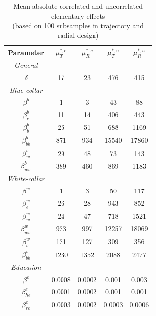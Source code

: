 \documentclass[a4paper,12pt]{article}
\begin{document}
\newpage
\setlength{\tabcolsep}{22pt} %
\begin{table}[H] 
	\centering
	\begin{threeparttable}
		\caption[Model Parametrization]{Mean absolute correlated and uncorrelated elementary effects\\ (based on 100 subsamples in trajectory and radial design)}
		\label{tab:devees}
		\renewcommand{\arraystretch}{1.2}%
		\begin{tabular}{cS[table-format=3.2]S[table-format=3.2]@{\hskip 0.7in}|@{\hskip 0.5in}S[table-format=3.2]S[table-format=3.2]}
			
			{Parameter}     & {$\mu^{*,c}_T$}   & {$\mu^{*,c}_R$} & {$\mu^{*,u}_T$} & {$\mu^{*,u}_R$}\\ \midrule
			\textit{General} \\
			$\delta$ & 17   & 23 & 476 & 415   \\    \midrule
			\textit{Blue-collar}\\    
			$\beta^b$ & 1   & 3            & 43 & 88    \\
			$\beta_e^b$ & 11  &    14        & 406  & 443    \\
			$\beta^b_b$ & 25  & 51            & 688  & 1169    \\
			$\beta^b_{bb}$ & 871 & 934           & 15540  & 17860     \\
			$\beta^b_w$ & 29    & 48             & 73  &  143  \\
			$\beta^b_{ww}$ & 389    & 460           & 869 &  1183    \\ \midrule
			\textit{White-collar}\\
			$\beta^w$ & 1   & 3            & 50 &  117   \\
			$\beta^w_e$ & 26   & 28          & 943 &  852    \\
			$\beta^w_w$ & 24  & 47            & 718 &  1521   \\
			$\beta^w_{ww}$ & 933  & 997           & 12257 & 18069   \\
			$\beta^w_b$ & 131 & 127           & 309 &  356   \\
			$\beta^w_{bb}$ & 1230 & 1352         & 2088 &  2477   \\ \midrule
			\textit{Education} \\
			$\beta^e$     & 0.0008    & 0.0002              & 0.001&  0.003   \\
			$\beta_{he}^e$     & 0.0001    & 0.0002              & 0.001  & 0.001    \\
			$\beta_{re}^e$     & 0.0003   & 0.0002               & 0.0003  &   0.0006  \\ \midrule

\end{tabular}
\end{threeparttable}
\end{table}
\end{document}
